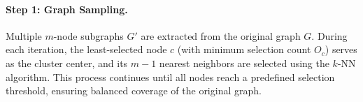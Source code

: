\documentclass[sigconf]{acmart}
\begin{document}


\paragraph{Step 1: Graph Sampling.} Multiple $m$-node subgraphs $G'$ are extracted from the original graph $G$. During each iteration, the least-selected node $c$ (with minimum selection count $O_c$) serves as the cluster center, and its $m-1$ nearest neighbors are selected using the $k$-NN algorithm. This process continues until all nodes reach a predefined selection threshold, ensuring balanced coverage of the original graph.
\end{document}
